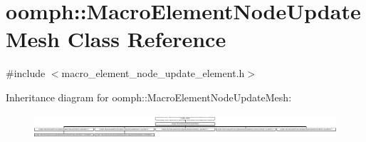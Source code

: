 \hypertarget{classoomph_1_1MacroElementNodeUpdateMesh}{}\section{oomph\+:\+:Macro\+Element\+Node\+Update\+Mesh Class Reference}
\label{classoomph_1_1MacroElementNodeUpdateMesh}


{\ttfamily \#include $<$macro\+\_\+element\+\_\+node\+\_\+update\+\_\+element.\+h$>$}

Inheritance diagram for oomph\+:\+:Macro\+Element\+Node\+Update\+Mesh\+:\begin{figure}[H]
\begin{center}
\leavevmode
\includegraphics[height=0.894212cm]{classoomph_1_1MacroElementNodeUpdateMesh}
\end{center}
\end{figure}
